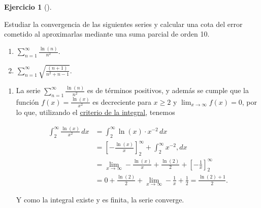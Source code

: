 \documentclass[
  spanish,
  a4paper,
]{scrreport}
\providecommand{\tightlist}{%
  \setlength{\itemsep}{0pt}\setlength{\parskip}{0pt}}
\theoremstyle{definition}
\newtheorem{exercise}{Ejercicio}[chapter]
\theoremstyle{remark}
\begin{document}
\begin{exercise}[]\protect\hypertarget{exr-4}{}\label{exr-4}

Estudiar la convergencia de las siguientes series y calcular una cota
del error cometido al aproximarlas mediante una suma parcial de orden
10.

\begin{enumerate}
\def\labelenumi{\alph{enumi}.}
\tightlist
\item
  \(\displaystyle \sum_{n=1}^\infty \frac{\ln(n)}{n^2}\).
\item
  \(\displaystyle \sum_{n=1}^\infty \sqrt{\frac{(n+1)}{n^2+n-1}}\).
\end{enumerate}

\end{exercise}

\begin{tcolorbox}[enhanced jigsaw, colbacktitle=quarto-callout-tip-color!10!white, opacityback=0, toptitle=1mm, title=\textcolor{quarto-callout-tip-color}{\faLightbulb}\hspace{0.5em}{Solución}, coltitle=black, opacitybacktitle=0.6, breakable, toprule=.15mm, leftrule=.75mm, titlerule=0mm, colframe=quarto-callout-tip-color-frame, left=2mm, bottomrule=.15mm, bottomtitle=1mm, arc=.35mm, rightrule=.15mm, colback=white]

\begin{enumerate}
\def\labelenumi{\alph{enumi}.}
\item
  La serie \(\displaystyle \sum_{n=1}^\infty \frac{\ln(n)}{n^2}\) es de
  términos positivos, y además se cumple que la función
  \(f(x)=\frac{\ln(x)}{x^2}\) es decreciente para \(x \geq 2\) y
  \(\lim_{x\to\infty} f(x) = 0\), por lo que, utilizando el
  \href{https://aprendeconalf.es/analisis-manual/09-series.html\#thm-criterio-integral}{criterio
  de la integral}, tenemos

  \begin{align*}
  \int_2^\infty \frac{\ln(x)}{x^2}\,dx
  &= \int_2^\infty \ln(x) \cdot x^{-2}\,dx \\
  &= \left[-\frac{\ln(x)}{x}\right]_2^\infty + \int_2^\infty x^{-2},dx \tag{Partes}\\
  &= \lim_{x\to\infty}-\frac{\ln(x)}{x} + \frac{\ln(2)}{2} + \left[ -\frac{1}{x} \right]_2^\infty \\
  &= 0 + \frac{\ln(2)}{2} + \lim_{x\to\infty} -\frac{1}{x} + \frac{1}{2}
  = \frac{\ln(2)+1}{2}.
  \end{align*}

  Y como la integral existe y es finita, la serie converge.


\end{enumerate}
\end{tcolorbox}
\end{document}
